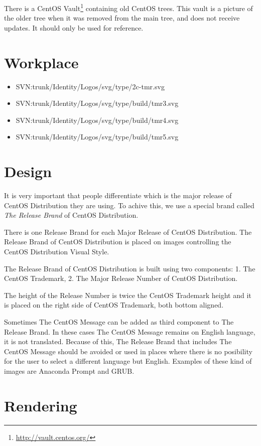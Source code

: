 \documentclass{article}
\begin{document}
There is a CentOS Vault\footnote{\url{http://vault.centos.org/}}
containing old CentOS trees. This vault is a picture of the older tree
when it was removed from the main tree, and does not receive updates.
It should only be used for reference. 

\section{Workplace}

\begin{itemize}
\item SVN:trunk/Identity/Logos/svg/type/2c-tmr.svg
\item SVN:trunk/Identity/Logos/svg/type/build/tmr3.svg
\item SVN:trunk/Identity/Logos/svg/type/build/tmr4.svg
\item SVN:trunk/Identity/Logos/svg/type/build/tmr5.svg
\end{itemize}

\section{Design}

It is very important that people differentiate which is the major
release of CentOS Distribution they are using. To achive this, we use
a special brand called \textit{The Release Brand} of CentOS
Distribution.

There is one Release Brand for each Major Release of CentOS
Distribution.  The Release Brand of CentOS Distribution is placed on
images controlling the CentOS Distribution Visual Style.

The Release Brand of CentOS Distribution is built using two
components: 1. The CentOS Trademark, 2. The Major Release Number of
CentOS Distribution.

The height of the Release Number is twice the CentOS Trademark height
and it is placed on the right side of CentOS Trademark, both bottom
aligned.

Sometimes The CentOS Message can be added as third component to The
Release Brand.  In these cases The CentOS Message remains on English
language, it is not translated.  Because of this, The Release Brand
that includes The CentOS Message should be avoided or used in places
where there is no posibility for the user to select a different
language but English.  Examples of these kind of images are Anaconda
Prompt and GRUB.

\section{Rendering}
\end{document}
